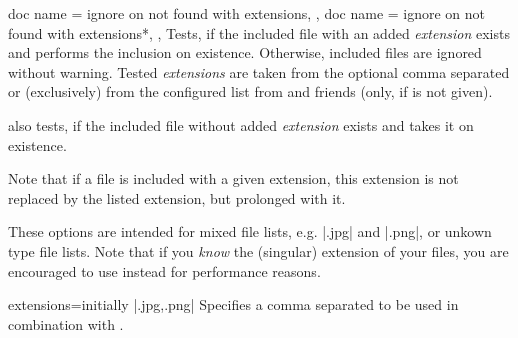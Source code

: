 \documentclass[a4paper,11pt]{ltxdoc}
\begin{document}
\begin{docIgrKeys}[
    doc parameter   = \colOpt{=\marg{extension list}},
    doc description = {initially unset},
    doc new  = 2021-10-16,
  ]
  {
    {
      doc name = ignore on not found with extensions,
    },
    {
      doc name = ignore on not found with extensions*,
    },
  }
  Tests, if the included file with an added \emph{extension} exists and
  performs the inclusion on existence. Otherwise, included files are ignored without warning.
  Tested \emph{extensions} are taken from the optional comma separated 
  or (exclusively) from the configured list from  and friends
  (only, if  is not given).\par
   also tests, if the included
  file without added \emph{extension} exists and takes it on existence.\par
  Note that if a file is included with a given extension, this extension is not
  replaced by the listed extension, but prolonged with it.\par
  These options are intended for mixed file lists, e.g. |.jpg| and |.png|, or
  unkown type file lists.
  Note that if you \emph{know} the (singular) extension of your files, you are
  encouraged to use  instead for performance reasons.
\begin{dispListing}
\end{dispListing}
\end{docIgrKeys}


\begin{docIgrKey}[][doc new=2021-10-16]{extensions}{=}{initially |.jpg,.png|}
  Specifies a comma separated  to be used in combination with
  .
\end{docIgrKey}
\end{document}
